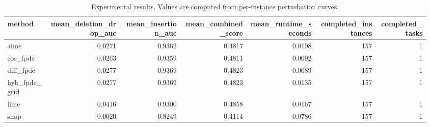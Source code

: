 \begin{table}[t]
\caption{Experimental results. Values are computed from per-instance perturbation curves.}
\label{tab:main_results_computed}
\centering
\begin{tabular}{lrrrrrr}
\toprule
method & mean\_deletion\_drop\_auc & mean\_insertion\_auc & mean\_combined\_score & mean\_runtime\_seconds & completed\_instances & completed\_tasks \\
\midrule
aime & 0.0271 & 0.9362 & 0.4817 & 0.0108 & 157 & 1 \\
cos\_fpde & 0.0263 & 0.9359 & 0.4811 & 0.0092 & 157 & 1 \\
diff\_fpde & 0.0277 & 0.9369 & 0.4823 & 0.0089 & 157 & 1 \\
hyb\_fpde\_grid & 0.0277 & 0.9369 & 0.4823 & 0.0135 & 157 & 1 \\
lime & 0.0416 & 0.9300 & 0.4858 & 0.0167 & 157 & 1 \\
shap & -0.0020 & 0.8249 & 0.4114 & 0.0786 & 157 & 1 \\
\bottomrule
\end{tabular}

\end{table}
